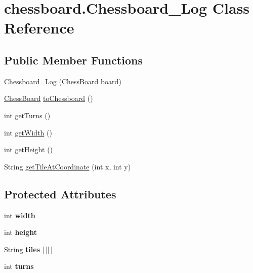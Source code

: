 \hypertarget{classchessboard_1_1_chessboard___log}{}\section{chessboard.\+Chessboard\+\_\+\+Log Class Reference}
\label{classchessboard_1_1_chessboard___log}
\subsection*{Public Member Functions}
\begin{DoxyCompactItemize}
\item 
\hyperlink{classchessboard_1_1_chessboard___log_a384258fcfa0ee1cdebc3aaeefbbb3b1e}{Chessboard\+\_\+\+Log} (\hyperlink{classchessboard_1_1_chess_board}{Chess\+Board} board)
\item 
\hyperlink{classchessboard_1_1_chess_board}{Chess\+Board} \hyperlink{classchessboard_1_1_chessboard___log_a3266897f1f2794261b6c34dc746913b9}{to\+Chessboard} ()
\item 
int \hyperlink{classchessboard_1_1_chessboard___log_a3969bceacf85592002a66eee9bc983c3}{get\+Turns} ()
\item 
int \hyperlink{classchessboard_1_1_chessboard___log_a8e81a3c0f7c83ea8c24c4266995923dc}{get\+Width} ()
\item 
int \hyperlink{classchessboard_1_1_chessboard___log_abb71e5ec723d33b2d5d4663af4f035b4}{get\+Height} ()
\item 
String \hyperlink{classchessboard_1_1_chessboard___log_a40c8d014f640fbb09da3c2ef4966c43c}{get\+Tile\+At\+Coordinate} (int x, int y)
\end{DoxyCompactItemize}
\subsection*{Protected Attributes}
\begin{DoxyCompactItemize}
\item 
\hypertarget{classchessboard_1_1_chessboard___log_a1307cb27af6ecddff06ebac5e29f30dc}{}int {\bfseries width}\label{classchessboard_1_1_chessboard___log_a1307cb27af6ecddff06ebac5e29f30dc}

\item 
\hypertarget{classchessboard_1_1_chessboard___log_adba869afdd69e27e54c22f4594435372}{}int {\bfseries height}\label{classchessboard_1_1_chessboard___log_adba869afdd69e27e54c22f4594435372}

\item 
\hypertarget{classchessboard_1_1_chessboard___log_a5c33c068bca1fe84b900c61a647b7cf7}{}String {\bfseries tiles} \mbox{[}$\,$\mbox{]}\mbox{[}$\,$\mbox{]}\label{classchessboard_1_1_chessboard___log_a5c33c068bca1fe84b900c61a647b7cf7}

\item 
\hypertarget{classchessboard_1_1_chessboard___log_a4ed9278cd6ff6478662abd0c2084401c}{}int {\bfseries turns}\label{classchessboard_1_1_chessboard___log_a4ed9278cd6ff6478662abd0c2084401c}

\end{DoxyCompactItemize}


